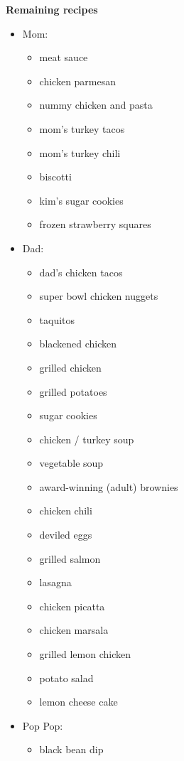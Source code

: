 \documentclass[11pt]{book}
\begin{document}
\newpage
\textbf{Remaining recipes}
\begin{itemize}
    \item Mom:
          \begin{itemize}
              \item meat sauce
              \item  chicken parmesan
              \item  nummy chicken and pasta
              \item  mom's turkey tacos
              \item  mom's turkey chili
              \item  biscotti
              \item  kim's sugar cookies
              \item  frozen strawberry squares
          \end{itemize}

    \item Dad:
          \begin{itemize}
              \item  dad's chicken tacos
              \item  super bowl chicken nuggets
              \item  taquitos
              \item  blackened chicken
              \item  grilled chicken
              \item  grilled potatoes
              \item  sugar cookies
              \item  chicken / turkey soup
              \item  vegetable soup
              \item  award-winning (adult) brownies
              \item  chicken chili
              \item  deviled eggs
              \item  grilled salmon
              \item  lasagna
              \item  chicken picatta
              \item  chicken marsala
              \item  grilled lemon chicken
              \item  potato salad
              \item  lemon cheese cake
          \end{itemize}

    \item Pop Pop:
          \begin{itemize}
              \item black bean dip
          \end{itemize}
\end{itemize}

\backmatter
\CookbookIndex{}
\end{document}
